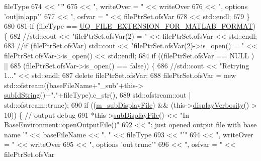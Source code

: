 \begin{DoxyCode}
       fileType
674                                   << \textcolor{stringliteral}{"'"}
675                                   << \textcolor{stringliteral}{", writeOver = "} << writeOver
676                                   << \textcolor{stringliteral}{", options 'out|in|app'"}
677                                   << \textcolor{stringliteral}{", osfvar = "} << filePtrSet.ofsVar
678                                   << std::endl;
679         \}
680 
681         \textcolor{keywordflow}{if} (fileType == \hyperlink{_defines_8h_ac440026eff7deb1c1eed1eea0e8e36ba}{UQ\_FILE\_EXTENSION\_FOR\_MATLAB\_FORMAT}) \{
682           \textcolor{comment}{//std::cout << "filePtrSet.ofsVar(2) = " << filePtrSet.ofsVar << std::endl;}
683           \textcolor{comment}{//if (filePtrSet.ofsVar) std::cout << "filePtrSet.ofsVar(2)->is\_open() = " <<
       filePtrSet.ofsVar->is\_open() << std::endl;}
684           \textcolor{keywordflow}{if} ((filePtrSet.ofsVar            == NULL ) ||
685               (filePtrSet.ofsVar->is\_open() == \textcolor{keyword}{false})) \{
686             \textcolor{comment}{//std::cout << "Retrying 1..." << std::endl;}
687             \textcolor{keyword}{delete} filePtrSet.ofsVar;
688             filePtrSet.ofsVar = \textcolor{keyword}{new} std::ofstream((baseFileName+\textcolor{stringliteral}{"\_sub"}+this->
      \hyperlink{class_q_u_e_s_o_1_1_base_environment_a73f7849acdd5d5ba15a3094fe18f258f}{subIdString}()+\textcolor{stringliteral}{"."}+fileType).c\_str(), 
689                                                   std::ofstream::out | std::ofstream::trunc);
690             \textcolor{keywordflow}{if} ((\hyperlink{class_q_u_e_s_o_1_1_base_environment_a52b4275aa8ee85994dd304d9fe95c9c5}{m\_subDisplayFile}) && (this->\hyperlink{class_q_u_e_s_o_1_1_base_environment_a1fe5f244fc0316a0ab3e37463f108b96}{displayVerbosity}() > 10)) \{ \textcolor{comment}{//
       output debug}
691               *this->\hyperlink{class_q_u_e_s_o_1_1_base_environment_a8a0064746ae8dddfece4229b9ad374d6}{subDisplayFile}() << \textcolor{stringliteral}{"In BaseEnvironment::openOutputFile()"}
692                                       << \textcolor{stringliteral}{": just opened output file with base name '"} << baseFileName << \textcolor{stringliteral}{".
      "} << fileType
693                                       << \textcolor{stringliteral}{"'"}
694                                       << \textcolor{stringliteral}{", writeOver = "} << writeOver
695                                       << \textcolor{stringliteral}{", options 'out|trunc'"}
696                                       << \textcolor{stringliteral}{", osfvar = "} << filePtrSet.ofsVar

\end{DoxyCode}
